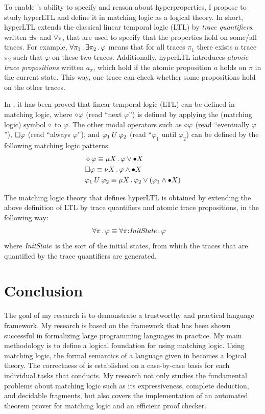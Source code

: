 \documentclass[11pt]{article}
\begin{document}
To enable \K's ability to specify and reason about hyperproperties, 
I propose to study hyperLTL and define it in matching logic as a logical 
theory. 
In short, hyperLTL extends the classical linear temporal logic (LTL) 
by \emph{trace quantifiers}, written
$\exists \pi$ and $\forall \pi$, that are used to specify that the properties 
hold on some/all traces. 
For example, $\forall \pi_1 \,.\, \exists \pi_2 \,.\, \varphi$ means that
for all traces $\pi_1$ there exists a trace $\pi_2$ such that
$\varphi$ on these two traces. 
Additionally, hyperLTL introduces \emph{atomic trace propositions}
written $a_\pi$, which hold if the atomic proposition $a$ holds on $\pi$ in the 
current state. 
This way, one trace can check whether some propositions hold on the other 
traces. 

In \cite{CR19}, it has been proved that linear temporal logic (LTL) can be defined in matching logic,
where $\circ \varphi$ (read ``next $\varphi$'') is defined by applying the (matching logic) symbol $\circ$ to $\varphi$.
The other modal operators such as
$\diamond \varphi$ (read ``eventually $\varphi$''),
$\square \varphi$ (read ``always $\varphi$''),
and $\varphi_1 \mathbin{U} \varphi_2$ (read ``$\varphi_1$ until $\varphi_2$)
can be defined by the following matching logic patterns:
\begin{align*}
& \diamond \varphi \equiv \mu X \,.\, \varphi \lor \bullet X \\
& \square \varphi \equiv \nu X \,.\, \varphi \land \bullet X \\
& \varphi_1 \mathbin{U} \varphi_2 \equiv \mu X \,.\, \varphi_2 \lor (\varphi_1 \land \bullet X)
\end{align*}

The matching logic theory that defines hyperLTL is obtained by extending
the above definition of LTL by trace quantifiers and atomic trace propositions,
in the following way:
\begin{align*}
& \forall \pi \,.\, \varphi \equiv \forall \pi {:} \mathit{InitState} \,.\, \varphi \end{align*}
where $\mathit{InitState}$ is the sort of the initial states, from which the traces 
that are quantified by the trace quantifiers are generated.

\section{Conclusion}

The goal of my research is to demonstrate a trustworthy and practical language framework.
My research is based on the \K framework that has been shown successful
in formalizing large programming languages in practice. 
My main methodology is to define a logical foundation for \K using matching logic.
Using matching logic, the formal semantics of a language given in \K becomes a logical theory.
The correctness of \K is established on a case-by-case basis for each individual tasks that \K conducts.  
My research not only 
studies the fundamental problems about matching logic such as
its expressiveness, complete deduction, and decidable fragments,
but also covers the implementation of an automated theorem prover for matching logic and an efficient proof checker.
\end{document}
